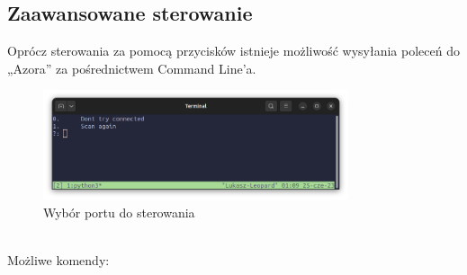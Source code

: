     \subsection{Zaawansowane sterowanie}
        \tab Oprócz sterowania za pomocą przycisków istnieje możliwość wysyłania poleceń do „Azora” za pośrednictwem Command Line'a.
        \begin{figure}[!h]
            \centering
            \includegraphics[width = 0.8\textwidth]{Img/CLI.png}
            \caption{Wybór portu do sterowania}
        \end{figure}
        \\Możliwe komendy:
